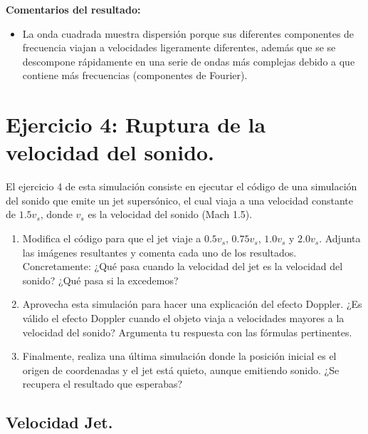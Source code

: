 \documentclass[a4paper,12pt]{article} %
\begin{document}
\begin{justify}
    \textbf{Comentarios del resultado:}
\end{justify}

\begin{itemize}
    \item La onda cuadrada muestra dispersión porque sus diferentes componentes de frecuencia viajan a velocidades ligeramente diferentes, además que se 
    se descompone rápidamente en una serie de ondas más complejas debido a que contiene más frecuencias (componentes de Fourier).
\end{itemize}

\section{Ejercicio 4: Ruptura de la velocidad del sonido.}

\begin{justify}
El ejercicio 4 de esta simulación consiste en ejecutar el código de una simulación del sonido que emite un jet supersónico, el cual viaja a una velocidad constante de \(1.5v_{s}\), donde \(v_{s}\) es la velocidad del sonido (Mach 1.5).
\end{justify}

\begin{enumerate}
    \item  Modifica el código para que el jet viaje a \(0.5v_{s}\), \(0.75v_{s}\), \(1.0v_{s}\) y \(2.0v_{s}\). Adjunta las imágenes resultantes y comenta cada uno de los resultados. Concretamente: ¿Qué pasa cuando la velocidad del jet es la velocidad del sonido? ¿Qué pasa si la excedemos?
    
    \item Aprovecha esta simulación para hacer una explicación del efecto Doppler. ¿Es válido el efecto Doppler cuando el objeto viaja a velocidades mayores a la velocidad del sonido? Argumenta tu respuesta con las fórmulas pertinentes.
    
    \item  Finalmente, realiza una última simulación donde la posición inicial es el origen de coordenadas y el jet está quieto, aunque emitiendo sonido. ¿Se recupera el resultado que esperabas?
\end{enumerate}

\subsection{Velocidad Jet.}
\end{document}
